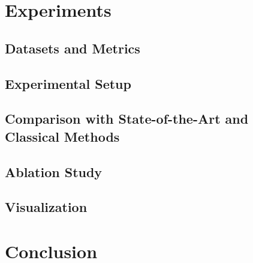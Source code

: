 \documentclass[letterpaper]{article}
\begin{document}
\section{Experiments}
\label{sec:experiments}

\subsection{Datasets and Metrics}
\label{sec:exp-data}

\subsection{Experimental Setup}
\label{sec:exp-setup}

\subsection{Comparison with State-of-the-Art and Classical Methods}
\label{sec:exp-main}

\subsection{Ablation Study}
\label{sec:exp-ablation}


\subsection{Visualization}
\label{sec:exp-visual}

\section{Conclusion}
\label{sec:conclusion}


\end{document}
